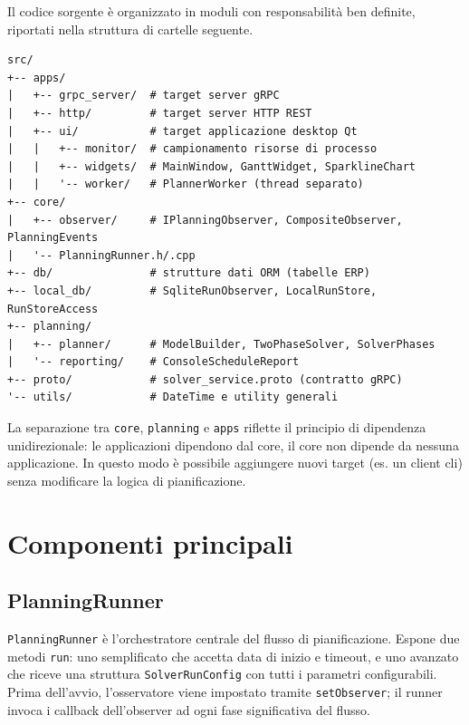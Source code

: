 Il codice sorgente è organizzato in moduli con responsabilità ben definite, riportati nella struttura di cartelle seguente.

\begin{listing}[H]
\begin{verbatim}
src/
+-- apps/
|   +-- grpc_server/  # target server gRPC
|   +-- http/         # target server HTTP REST
|   +-- ui/           # target applicazione desktop Qt
|   |   +-- monitor/  # campionamento risorse di processo
|   |   +-- widgets/  # MainWindow, GanttWidget, SparklineChart
|   |   '-- worker/   # PlannerWorker (thread separato)
+-- core/
|   +-- observer/     # IPlanningObserver, CompositeObserver, PlanningEvents
|   '-- PlanningRunner.h/.cpp
+-- db/               # strutture dati ORM (tabelle ERP)
+-- local_db/         # SqliteRunObserver, LocalRunStore, RunStoreAccess
+-- planning/
|   +-- planner/      # ModelBuilder, TwoPhaseSolver, SolverPhases
|   '-- reporting/    # ConsoleScheduleReport
+-- proto/            # solver_service.proto (contratto gRPC)
'-- utils/            # DateTime e utility generali
\end{verbatim}
\caption{Struttura delle cartelle del progetto.}
\label{listing:struttura}
\end{listing}

La separazione tra \texttt{core}, \texttt{planning} e \texttt{apps} riflette il principio di dipendenza unidirezionale: le applicazioni dipendono dal core, il core non dipende da nessuna applicazione. In questo modo è possibile aggiungere nuovi target (es. un client \gls{cli}) senza modificare la logica di pianificazione.

\section{Componenti principali}
\label{sec:componenti}

\subsection{PlanningRunner}
\label{subsec:planningrunner}

\texttt{PlanningRunner} è l'orchestratore centrale del flusso di pianificazione. Espone due metodi \texttt{run}: uno semplificato che accetta data di inizio e timeout, e uno avanzato che riceve una struttura \texttt{SolverRunConfig} con tutti i parametri configurabili. Prima dell'avvio, l'osservatore viene impostato tramite \texttt{setObserver}; il runner invoca i callback dell'observer ad ogni fase significativa del flusso.

